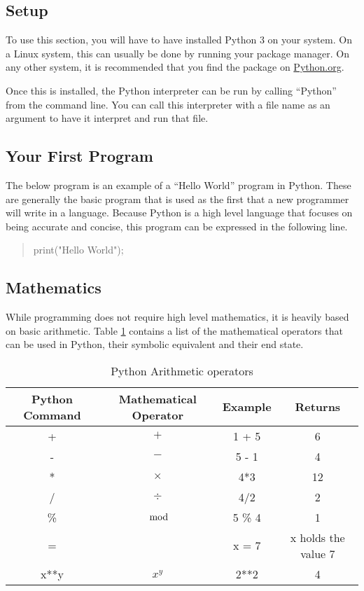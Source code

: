 		\subsection{Setup}
			To use this section, you will have to have installed Python 3 on your system.
			On a Linux system, this can usually be done by running your package manager.
			On any other system, it is recommended that you find the package on \url{Python.org}.

			Once this is installed, the Python interpreter can be run by calling ``Python'' from the command line.
			You can call this interpreter with a file name as an argument to have it interpret and run that file.

		\subsection{Your First Program}
			The below program is an example of a ``Hello World'' program in Python.
			These are generally the basic program that is used as the first that a new programmer will write in a language.
			Because Python is a high level language that focuses on being accurate and concise, this program can be expressed in the following line.
			\begin{quote}
				print("Hello World");
			\end{quote}

		\subsection{Mathematics}
			While programming does not require high level mathematics, it is heavily based on basic arithmetic.
			Table \ref{tab:PythonMaths} contains a list of the mathematical operators that can be used in Python, their symbolic equivalent and their end state.
			\begin{table}[htb]
				\centering
				\begin{adjustbox}{max width=1\textwidth}
				\begin{tabular}{cccc}
					\toprule
					\textbf{Python Command} & \textbf{Mathematical Operator} & \textbf{Example} & \textbf{Returns} \\
					\toprule
					+ & $+$ & 1 + 5 & 6 \\
					- & $-$ & 5 - 1 & 4 \\
					* & $\times$ & 4*3 & 12 \\
					/ & $\div$ & 4/2 & 2 \\
					\% & $\mod$ & 5 \% 4 & 1 \\
					= &  & x = 7 & x holds the value 7 \\
					x**y & $x^y$ & 2**2 & 4 \\
					\bottomrule
				\end{tabular}
				\end{adjustbox}
				\caption{Python Arithmetic operators}
				\label{tab:PythonMaths}
			\end{table}
